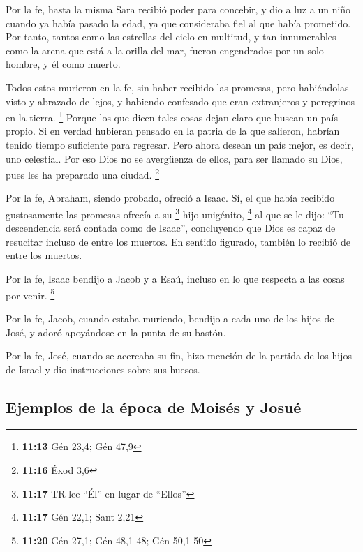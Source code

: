  Por la fe, hasta la misma Sara recibió poder para
concebir, y dio a luz a un niño cuando ya había pasado la edad, ya que
consideraba fiel al que había prometido.  Por tanto,
tantos como las estrellas del cielo en multitud, y tan innumerables como
la arena que está a la orilla del mar, fueron engendrados por un solo
hombre, y él como muerto.

 Todos estos murieron en la fe, sin haber recibido las
promesas, pero habiéndolas visto y abrazado de lejos, y habiendo
confesado que eran extranjeros y peregrinos en la tierra. \footnote{\textbf{11:13}
  Gén 23,4; Gén 47,9}  Porque los que dicen tales cosas
dejan claro que buscan un país propio.  Si en verdad
hubieran pensado en la patria de la que salieron, habrían tenido tiempo
suficiente para regresar.  Pero ahora desean un país
mejor, es decir, uno celestial. Por eso Dios no se avergüenza de ellos,
para ser llamado su Dios, pues les ha preparado una ciudad. \footnote{\textbf{11:16}
  Éxod 3,6}

 Por la fe, Abraham, siendo probado, ofreció a Isaac. Sí,
el que había recibido gustosamente las promesas ofrecía a su \footnote{\textbf{11:17}
  TR lee ``Él'' en lugar de ``Ellos''} hijo unigénito, \footnote{\textbf{11:17}
  Gén 22,1; Sant 2,21}  al que se le dijo: ``Tu
descendencia será contada como de Isaac'',  concluyendo
que Dios es capaz de resucitar incluso de entre los muertos. En sentido
figurado, también lo recibió de entre los muertos.

 Por la fe, Isaac bendijo a Jacob y a Esaú, incluso en lo
que respecta a las cosas por venir. \footnote{\textbf{11:20} Gén 27,1;
  Gén 48,1-48; Gén 50,1-50}

 Por la fe, Jacob, cuando estaba muriendo, bendijo a cada
uno de los hijos de José, y adoró apoyándose en la punta de su bastón.

 Por la fe, José, cuando se acercaba su fin, hizo mención
de la partida de los hijos de Israel y dio instrucciones sobre sus
huesos.

\hypertarget{ejemplos-de-la-uxe9poca-de-moisuxe9s-y-josuuxe9}{%
\subsection{Ejemplos de la época de Moisés y
Josué}\label{ejemplos-de-la-uxe9poca-de-moisuxe9s-y-josuuxe9}}

